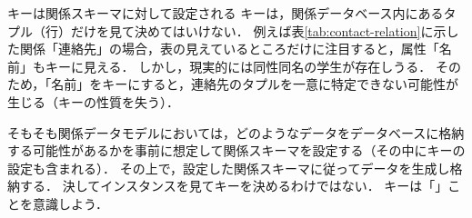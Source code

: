 \begin{notebox}{キーは関係スキーマに対して設定される}
キーは，関係データベース内にあるタプル（行）だけを見て決めてはいけない．
例えば表\ref{tab:contact-relation}に示した関係「連絡先」の場合，表の見えているところだけに注目すると，属性「名前」もキーに見える．
しかし，現実的には同性同名の学生が存在しうる．
そのため，「名前」をキーにすると，連絡先のタプルを一意に特定できない可能性が生じる（キーの性質を失う）．

そもそも関係データモデルにおいては，どのようなデータをデータベースに格納する可能性があるかを事前に想定して関係スキーマを設定する（その中にキーの設定も含まれる）．
その上で，設定した関係スキーマに従ってデータを生成し格納する．
決してインスタンスを見てキーを決めるわけではない．
キーは「」ことを意識しよう．
\end{notebox}


